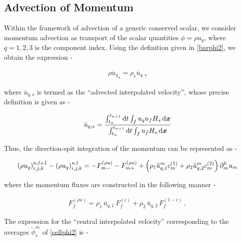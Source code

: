 \subsection*{Advection of Momentum}

Within the framework of advection of a generic conserved scalar,
we consider momentum advection as transport of the scalar quantities  
$\phi=\rho u_q$, where $q=1,2,3$ is the component index. 
Using the definition given in \eqref{barphi2}, 
we obtain the expression -  



\begin{align} 
\overline{\rho u_q}_s = \rho_s \bar u_{q,s} 
\end{align}


where $\bar u_{q,s}$ is termed as the ``advected interpolated velocity'', 
whose precise definition is given as - 


\begin{align}
	\bar u_{q,s} =  \frac{\int_{t_n}^{t_{n+1}} {\textrm{d}}t \int_{f}  u_q u_f  H_s  \, {\textrm{d}}\boldsymbol{x}}{\int_{t_n}^{t_{n+1}} {\textrm{d}}t \int_{f}  u_f  H_s\,{\textrm{d}}\boldsymbol{x}} \label{barudef}
\end{align}



Thus, the direction-spit integration of the momentum can be represented as - 


\begin{align}
{(\rho u_{q})_{i,j,k}^{n,l+1} - (\rho u_{q})_{i,j,k}^{n,l}}  = - F^{(\rho u)}_{m-} - F^{(\rho u)}_{m+}
 + \Big( \rho_1 \tilde u_{q,1}^m  c^{(1)}_m +  \rho_2 \tilde u_{q,2}^m c^{(2)}_m 
 \Big) \, \partial_{m}^h u_m 
\label{sumfrou}
\end{align}


where the momentum fluxes are constructed in the following manner -


\begin{align}
 F^{(\rho u)}_{f} =  \rho_1 \,\bar u_{q,1}  \,F^{(c)}_{f}  +  
 \rho_2 \,\bar u_{q,2}  \,F^{(1-c)}_{f} \,,
\end{align}


The expression for the ``central interpolated velocity'' corresponding to the 
averages $\tilde \phi_s^m$ of \eqref{cellphi2} is -  

